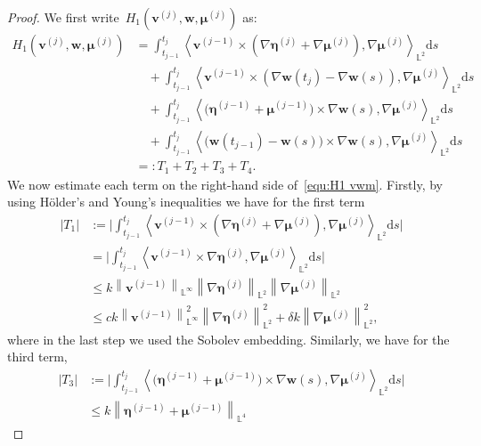 \documentclass[11pt,reqno]{amsart}
\theoremstyle{definition}
\numberwithin{equation}{section}
\newcommand{\bff}{\boldsymbol}
\newcommand{\bb}{\mathbb}
\newcommand{\ds}{\mathrm{d}s}
\newcommand{\nn}{\nonumber}
\newcommand{\norm}[2]{\left\|{#1}\right\|_{#2}}
\newcommand{\inpro}[2]{\left\langle#1,#2\right\rangle}
\begin{document}
\begin{proof}
	We first write~$H_1(\bff{v}^{(j)},\bff{w},\bff{\mu}^{(j)})$ as:
	\begin{align}\label{equ:H1 vwm} 
		H_1(\bff{v}^{(j)},\bff{w},\bff{\mu}^{(j)})
		&=
		\int_{t_{j-1}}^{t_j} 
		\inpro{\bff{v}^{(j-1)} \times (\nabla\bff{\eta}^{(j)} +
			\nabla\bff{\mu}^{(j)})}{\nabla\bff{\mu}^{(j)}}_{\bb{L}^2} \ds
		\nn\\
		&\quad +
		\int_{t_{j-1}}^{t_j} 
		\inpro{\bff{v}^{(j-1)} \times (\nabla\bff{w}(t_j) -
			\nabla\bff{w}(s))}{\nabla\bff{\mu}^{(j)}}_{\bb{L}^2} \ds
		\nn\\
		&\quad +
		\int_{t_{j-1}}^{t_j} 
		\inpro{
			\big(\bff{\eta}^{(j-1)} + \bff{\mu}^{(j-1)}\big)
			\times \nabla\bff{w}(s)}{\nabla\bff{\mu}^{(j)}}_{\bb{L}^2} \ds
		\nn\\
		&\quad +
		\int_{t_{j-1}}^{t_j} 
		\inpro{
			\big(\bff{w}(t_{j-1})-\bff{w}(s)\big) \times \nabla\bff{w}(s)}
		{\nabla\bff{\mu}^{(j)}}_{\bb{L}^2} \ds
		\nn\\
		&=: T_1 + T_2 + T_3 + T_4.
	\end{align}
	We now estimate each term on the right-hand side of~\eqref{equ:H1 vwm}. Firstly, by using
	H\"older's and Young's inequalities we have for the first term
	\begin{align}\label{equ:est T1}
		|T_1|
		&:=
		\Big|
		\int_{t_{j-1}}^{t_j} 
		\inpro{\bff{v}^{(j-1)} \times (\nabla\bff{\eta}^{(j)} +
			\nabla\bff{\mu}^{(j)})}{\nabla\bff{\mu}^{(j)}}_{\bb{L}^2} \ds
		\Big|
		\nn\\
		&=
		\Big|
		\int_{t_{j-1}}^{t_j} 
		\inpro{\bff{v}^{(j-1)} \times
			\nabla\bff{\eta}^{(j)}}{\nabla\bff{\mu}^{(j)}}_{\bb{L}^2} \ds 
		\Big|
		\nn\\
		&\le
		k \norm{\bff{v}^{(j-1)}}{\bb{L}^\infty} 
		\norm{\nabla\bff{\eta}^{(j)}}{\bb{L}^2} 
		\norm{\nabla\bff{\mu}^{(j)}}{\bb{L}^2} 
		\nn\\
		&\le
		ck \norm{\bff{v}^{(j-1)}}{\bb{L}^\infty}^2
			\norm{\nabla\bff{\eta}^{(j)}}{\bb{L}^2}^2
		+
		\delta k
		\norm{\nabla\bff{\mu}^{(j)}}{\bb{L}^2}^2,
	\end{align}
	where in the last step we used the Sobolev embedding.
	Similarly, we have for the third term,
	\begin{align*} 
		|T_3|
		&:=
		\Big|
		\int_{t_{j-1}}^{t_j} 
		\inpro{\big(\bff{\eta}^{(j-1)} + \bff{\mu}^{(j-1)}\big)
			\times \nabla\bff{w}(s)}{\nabla\bff{\mu}^{(j)}}_{\bb{L}^2} \ds
		\Big|
		\\
		&\le
		k
		\norm{\bff{\eta}^{(j-1)} + \bff{\mu}^{(j-1)}}{\bb{L}^4} 

\end{align*}
\end{proof}
\end{document}
